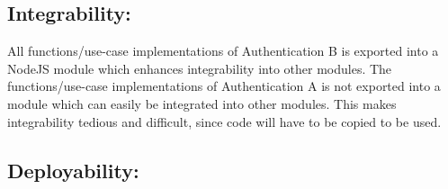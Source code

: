 \subsection{Integrability:}
All functions/use-case implementations of Authentication B is exported into a NodeJS module which enhances integrability into other modules.
The functions/use-case implementations of Authentication A is not exported into a module which can easily be integrated into other modules. This makes integrability tedious and difficult, since code will have to be copied to be used.

\subsection{Deployability:}